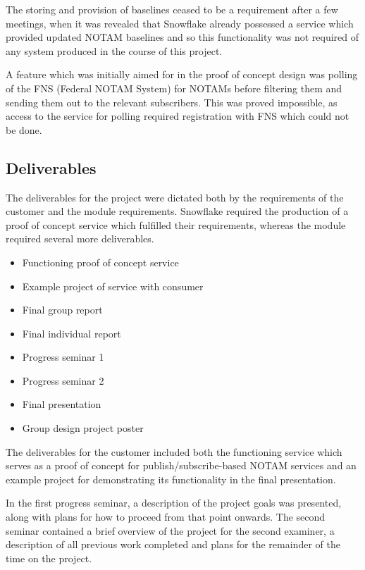\documentclass[a4paper, 12pt, twoside]{article}
\begin{document}
The storing and provision of baselines ceased to be a requirement after a few meetings, when it was revealed that Snowflake already possessed a service which provided updated NOTAM baselines and so this functionality was not required of any system produced in the course of this project.

A feature which was initially aimed for in the proof of concept design was polling of the FNS (Federal NOTAM System) for NOTAMs before filtering them and sending them out to the relevant subscribers. This was proved impossible, as access to the service for polling required registration with FNS which could not be done.

\subsection{Deliverables}
\label{sec:plan_deliverables}

The deliverables for the project were dictated both by the requirements of the customer and the module requirements. Snowflake required the production of a proof of concept service which fulfilled their requirements, whereas the module required several more deliverables.

\begin{itemize}
\item Functioning proof of concept service
\item Example project of service with consumer
\item Final group report
\item Final individual report
\item Progress seminar 1
\item Progress seminar 2
\item Final presentation
\item Group design project poster
\end{itemize}

The deliverables for the customer included both the functioning service which serves as a proof of concept for publish/subscribe-based NOTAM services and an example project for demonstrating its functionality in the final presentation.

In the first progress seminar, a description of the project goals was presented, along with plans for how to proceed from that point onwards. The second seminar contained a brief overview of the project for the second examiner, a description of all previous work completed and plans for the remainder of the time on the project.
\end{document}

